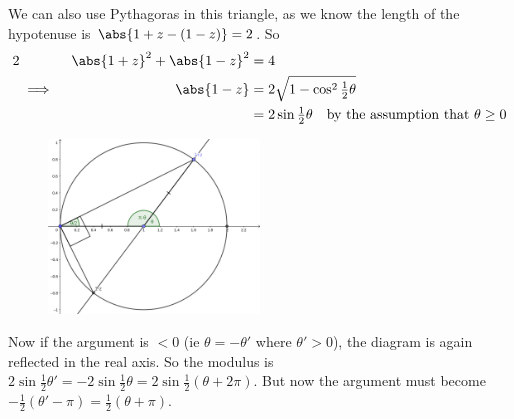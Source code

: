 \documentclass[fleqn,a4paper,11pt]{article}
\begin{document}
\begin{enumerate}
\begin{enumerate}[(i)]
      We can also use Pythagoras in this triangle, as we know the length of the
      hypotenuse is \(\abs{1 + z - (1 - z)} = 2\). So
      \begin{alignat*}2
       && \abs{1 + z}^2 + \abs{1 - z}^2 &= 4 \\
       &\implies{}& \abs{1 - z} &= 2 \sqrt{1 - \cos^2 \tfrac 12 \theta} \\
       &&                       &= 2 \sin \tfrac 12 \theta \quad
                    \text{by the assumption that \(\theta \ge 0\)}
      \end{alignat*}
      \begin{figure}[H]
       \begin{center}
        \includegraphics[width=0.5\textwidth]{q2_gg.png}
       \end{center}
      \end{figure}
      Now if the argument is \(< 0\) (ie \(\theta = -\theta'\) where
      \(\theta' > 0\)), the diagram is again reflected in the real axis.
      So the modulus is
      \(2\sin \frac 12 \theta' = -2\sin \frac 12 \theta
        = 2\sin \frac 12 (\theta + 2\pi)\).
      But now the argument must become
      \(-\frac 12 (\theta' - \pi) = \frac 12 (\theta + \pi)\).


\end{enumerate}
\end{enumerate}
\end{document}
